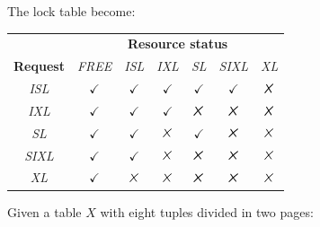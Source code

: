 \begin{itemize}
    The lock table become: 
    \begin{table}[H]
        \centering
        \begin{tabular}{ccccccc}
        \textbf{}                             & \multicolumn{6}{c}{\textbf{Resource status}}                                                                                                                                                                            \\ \cline{2-7} 
        \multicolumn{1}{c|}{\textbf{Request}} & \multicolumn{1}{c|}{\textit{FREE}} & \multicolumn{1}{c|}{\textit{ISL}} & \multicolumn{1}{c|}{\textit{IXL}} & \multicolumn{1}{c|}{\textit{SL}}  & \multicolumn{1}{c|}{\textit{SIXL}} & \multicolumn{1}{c|}{\textit{XL}}  \\ \hline
        \multicolumn{1}{|c|}{\textit{ISL}}    & \multicolumn{1}{c|}{$\checkmark$}  & \multicolumn{1}{c|}{$\checkmark$} & \multicolumn{1}{c|}{$\checkmark$} & \multicolumn{1}{c|}{$\checkmark$} & \multicolumn{1}{c|}{$\checkmark$}  & \multicolumn{1}{c|}{$\tikzxmark$} \\ \hline
        \multicolumn{1}{|c|}{\textit{IXL}}    & \multicolumn{1}{c|}{$\checkmark$}  & \multicolumn{1}{c|}{$\checkmark$} & \multicolumn{1}{c|}{$\checkmark$} & \multicolumn{1}{c|}{$\tikzxmark$} & \multicolumn{1}{c|}{$\tikzxmark$}  & \multicolumn{1}{c|}{$\tikzxmark$} \\ \hline
        \multicolumn{1}{|c|}{\textit{SL}}     & \multicolumn{1}{c|}{$\checkmark$}  & \multicolumn{1}{c|}{$\checkmark$} & \multicolumn{1}{c|}{$\tikzxmark$} & \multicolumn{1}{c|}{$\checkmark$} & \multicolumn{1}{c|}{$\tikzxmark$}  & \multicolumn{1}{c|}{$\tikzxmark$} \\ \hline
        \multicolumn{1}{|c|}{\textit{SIXL}}   & \multicolumn{1}{c|}{$\checkmark$}  & \multicolumn{1}{c|}{$\checkmark$} & \multicolumn{1}{c|}{$\tikzxmark$} & \multicolumn{1}{c|}{$\tikzxmark$} & \multicolumn{1}{c|}{$\tikzxmark$}  & \multicolumn{1}{c|}{$\tikzxmark$} \\ \hline
        \multicolumn{1}{|c|}{\textit{XL}}     & \multicolumn{1}{c|}{$\checkmark$}  & \multicolumn{1}{c|}{$\tikzxmark$} & \multicolumn{1}{c|}{$\tikzxmark$} & \multicolumn{1}{c|}{$\tikzxmark$} & \multicolumn{1}{c|}{$\tikzxmark$}  & \multicolumn{1}{c|}{$\tikzxmark$} \\ \hline
        \end{tabular}
    \end{table}
    \begin{example}
        Given a table $X$ with eight tuples divided in two pages: 

\end{example}
\end{itemize}
